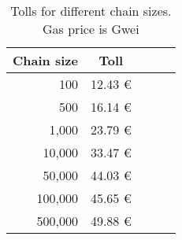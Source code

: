 \begin{wraptable}{h}{6.0cm}
    \centering
    \begin{tabular}{@{}lccll@{}}
        \toprule
        \multicolumn{1}{c}{\textbf{Chain size}} & \textbf{Toll}  \\ \midrule
        \multicolumn{1}{r}{    100} & \multicolumn{1}{r}{ 12.43 \euro{} } \\
        \multicolumn{1}{r}{    500} & \multicolumn{1}{r}{ 16.14 \euro{} } \\
        \multicolumn{1}{r}{  1,000} & \multicolumn{1}{r}{ 23.79 \euro{} } \\
        \multicolumn{1}{r}{ 10,000} & \multicolumn{1}{r}{ 33.47 \euro{} } \\
        \multicolumn{1}{r}{ 50,000} & \multicolumn{1}{r}{ 44.03 \euro{} } \\
        \multicolumn{1}{r}{100,000} & \multicolumn{1}{r}{ 45.65 \euro{} } \\
        \multicolumn{1}{r}{500,000} & \multicolumn{1}{r}{ 49.88 \euro{} } \\
        \bottomrule
    \end{tabular}
    \caption{Tolls for different chain sizes. Gas price is Gwei}
    \label{table:old_cost_in_fiat}
\end{wraptable}
